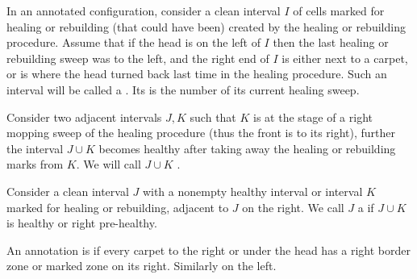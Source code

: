 \documentclass[12pt]{memoir}
\begin{document}
\begin{definition}\label{def:regular-annotation}
In an annotated configuration, 
consider a clean interval \( I \) of cells marked for healing or rebuilding
(that could have been) created by the healing or rebuilding procedure.
Assume that if the head is on the left of \( I \) then the last healing or rebuilding
sweep was to the left, and the right end of \( I \) is either next to a carpet,
or is where the head turned back last time in the healing procedure.
Such an interval will be called a .
Its  is the number of its current healing sweep.

Consider two adjacent intervals \( J,K \) such that
\( K \) is at the stage of a right mopping sweep of the healing procedure
(thus the front is to its right), further 
the interval \( J\cup K \) becomes healthy after taking away the healing or rebuilding
marks from \( K \).
We will call \( J\cup K \) .

Consider a clean interval \( J \) with a nonempty healthy interval 
or interval \( K \) marked for healing or rebuilding, adjacent to \( J \) on the right.
We call \( J \) a  if \( J\cup  K \) is healthy or right pre-healthy.


An annotation is  if every carpet to the right or under the head has a
right border zone or marked zone on its right.
Similarly on the left.

\end{definition}


\end{document}
